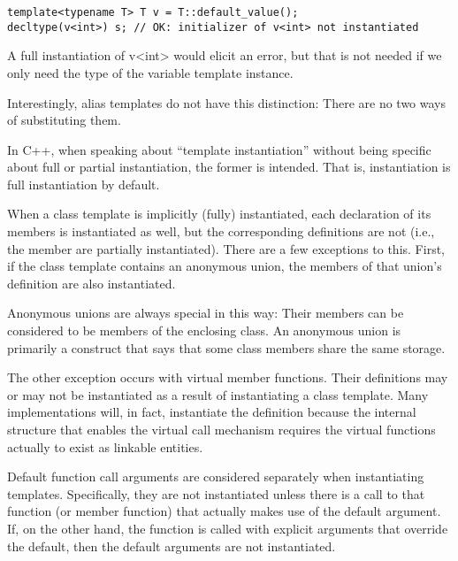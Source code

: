 \begin{lstlisting}[style=styleCXX]
template<typename T> T v = T::default_value();
decltype(v<int>) s; // OK: initializer of v<int> not instantiated
\end{lstlisting}

A full instantiation of v<int> would elicit an error, but that is not needed if we only need the type of the variable template instance.

Interestingly, alias templates do not have this distinction: There are no two ways of substituting them.

In C++, when speaking about “template instantiation” without being specific about full or partial instantiation, the former is intended. That is, instantiation is full instantiation by default.


When a class template is implicitly (fully) instantiated, each declaration of its members is instantiated as well, but the corresponding definitions are not (i.e., the member are partially instantiated). There are a few exceptions to this. First, if the class template contains an anonymous union, the members of that union’s definition are also instantiated.

\begin{tcolorbox}[colback=webgreen!5!white,colframe=webgreen!75!black]
\hspace*{0.75cm}Anonymous unions are always special in this way: Their members can be considered to be members of the enclosing class. An anonymous union is primarily a construct that says that some class members share the same storage.
\end{tcolorbox}

The other exception occurs with virtual member functions. Their definitions may or may not be instantiated as a result of instantiating a class template. Many implementations will, in fact, instantiate the definition because the internal structure that enables the virtual call mechanism requires the virtual functions actually to exist as linkable entities. 

Default function call arguments are considered separately when instantiating templates. Specifically, they are not instantiated unless there is a call to that function (or member function) that actually makes use of the default argument. If, on the other hand, the function is called with explicit arguments that override the default, then the default arguments are not instantiated.

